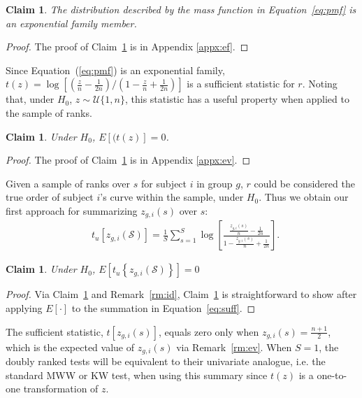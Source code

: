 \documentclass[12pt]{article}
\theoremstyle{plain}
\newtheorem{claim}[axiom]{Claim}
\theoremstyle{remark}
\begin{document}
\begin{claim}\label{cl:ef}
The distribution described by the mass function in Equation~\ref{eq:pmf} is an exponential family member.
\end{claim}

\begin{proof}
The proof of Claim~\ref{cl:ef} is in Appendix \ref{appx:ef}.
\end{proof}

Since Equation~(\ref{eq:pmf}) is an exponential family, $t(z) = \log\left[ \left(\frac{z}{n}- \frac{1}{2n}\right)\bigg/\left(1-\frac{z}{n} + \frac{1}{2n}\right) \right]$ is a sufficient statistic for $r$. Noting that, under $H_0$, $z \sim \mathcal{U}\{1,n\}$, this statistic has a useful property when applied to the sample of ranks. 

\begin{claim}\label{cl:ssm}
Under $H_0$, $E[(t(z)] = 0$.
\end{claim}

\begin{proof}
The proof of Claim~\ref{cl:ssm} is in Appendix \ref{appx:ev}.
\end{proof}

Given a sample of ranks over $s$ for subject $i$ in group $g$, $r$ could be considered the true order of subject $i$'s curve within the sample, under $H_0$. Thus we obtain our first approach for summarizing $z_{g,i}(s)$ over $s$:
\begin{align}
	&t_u\left[z_{g,i}(\mathcal{S})\right] = \frac{1}{S} \sum_{s=1}^S\log\left[ \frac{\frac{z_{g,i}(s)}{n}- \frac{1}{2n}}{1-\frac{z_{g,i}(s)}{n} + \frac{1}{2n}} \right]. \label{eq:suff}
\end{align}

	\begin{claim}\label{cl:suff} 
		Under $H_0$, $E\left[t_u\left\{z_{g,i}(\mathcal{S})\right\}\right] = 0$
	\end{claim}

	\begin{proof}
		 Via Claim~\ref{cl:ssm} and Remark~\ref{rm:id}, Claim~\ref{cl:suff} is straightforward to show after applying $E[\cdot]$ to the summation in Equation~\eqref{eq:suff}.
	\end{proof}

	The sufficient statistic, $t[z_{g,i}(s)]$, equals zero only when $z_{g,i}(s) = \frac{n+1}{2}$, which is the expected value of $z_{g,i}(s)$ via Remark~\ref{rm:ev}. When $S = 1$, the doubly ranked tests will be equivalent to their univariate analogue, i.e. the standard MWW or KW test, when using this summary since $t(z)$ is a one-to-one transformation of $z$.
\end{document}
